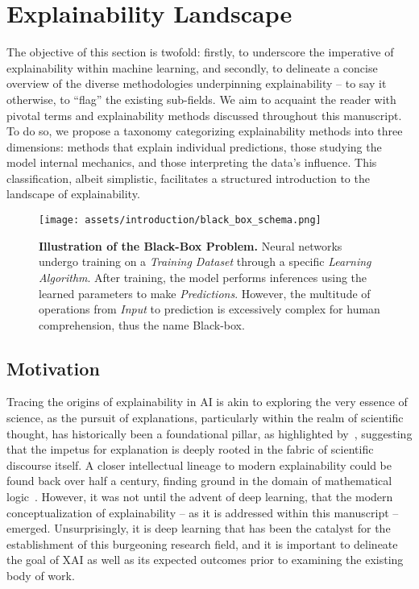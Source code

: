 \section{Explainability Landscape}
\label{sec:intro:xai_landscape}


The objective of this section is twofold: firstly, to underscore the imperative of explainability within machine learning, and secondly, to delineate a concise overview of the diverse methodologies underpinning explainability -- to say it otherwise, to ``flag'' the existing sub-fields. We aim to acquaint the reader with pivotal terms and explainability methods discussed throughout this manuscript. To do so, we propose a taxonomy categorizing explainability methods into three dimensions: methods that explain individual predictions, those studying the model internal mechanics, and those interpreting the data's influence. This classification, albeit simplistic, facilitates a structured introduction to the landscape of explainability.

\begin{figure}[ht]
    \centering
    \texttt{[image: assets/introduction/black\_box\_schema.png]}
    \caption{\textbf{Illustration of the Black-Box Problem.} Neural networks undergo training on a \textit{Training Dataset} through a specific \textit{Learning Algorithm}. After training, the model performs inferences using the learned parameters to make \textit{Predictions}. However, the multitude of operations from \textit{Input} to prediction is excessively complex for human comprehension, thus the name Black-box.}
    \label{fig:intro:blackbox}
\end{figure}

\subsection{Motivation}
\label{sec:intro:motivation}

Tracing the origins of explainability in AI is akin to exploring the very essence of science, as the pursuit of explanations, particularly within the realm of scientific thought, has historically been a foundational pillar, as highlighted by~\cite{hospers1946explanation}, suggesting that the impetus for explanation is deeply rooted in the fabric of scientific discourse itself. 
A closer intellectual lineage to modern explainability could be found back over half a century, finding ground in the domain of mathematical logic~\cite{hempel1948studies}.
However, it was not until the advent of deep learning, that the modern conceptualization of explainability -- as it is addressed within this manuscript -- emerged. Unsurprisingly, it is deep learning that has been the catalyst for the establishment of this burgeoning research field, and it is important to delineate the goal of XAI as well as its expected outcomes prior to examining the existing body of work.

